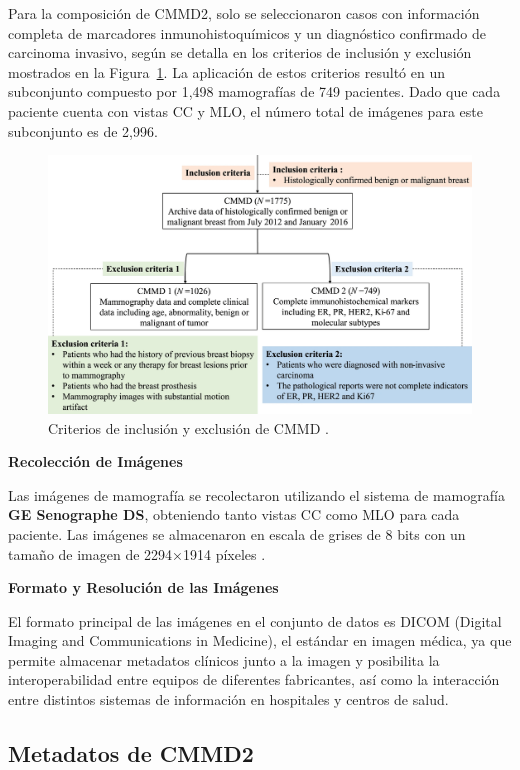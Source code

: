 \documentclass[a4paper,10pt]{book}
\begin{document}
Para la composición de CMMD2, solo se seleccionaron casos con información completa de marcadores inmunohistoquímicos y un diagnóstico confirmado de carcinoma invasivo, según se detalla en los criterios de inclusión y exclusión mostrados en la Figura~\ref{fig:cmmd_criteria}. La aplicación de estos criterios resultó en un subconjunto compuesto por 1,498 mamografías de 749 pacientes. Dado que cada paciente cuenta con vistas CC y MLO, el número total de imágenes para este subconjunto es de 2,996.

\begin{figure}[h!]
\centering
\includegraphics[width=0.85\linewidth]{reports//assets/cmmd_criteria.png}
\caption[Criterios de inclusión y exclusión de CMMD]{Criterios de inclusión y exclusión de CMMD \cite{cai_online_2023}.}
\label{fig:cmmd_criteria}
\end{figure}

\textbf{Recolección de Imágenes}

Las imágenes de mamografía se recolectaron utilizando el sistema de mamografía \textbf{GE Senographe DS}, obteniendo tanto vistas CC como MLO para cada paciente. Las imágenes se almacenaron en escala de grises de 8 bits con un tamaño de imagen de 2294×1914 píxeles \cite{cai_online_2023}.

\textbf{Formato y Resolución de las Imágenes}

El formato principal de las imágenes en el conjunto de datos es DICOM (Digital Imaging and Communications in Medicine), el estándar en imagen médica, ya que permite almacenar metadatos clínicos junto a la imagen y posibilita la interoperabilidad entre equipos de diferentes fabricantes, así como la interacción entre distintos sistemas de información en hospitales y centros de salud.

\subsection{Metadatos de CMMD2}
\end{document}

